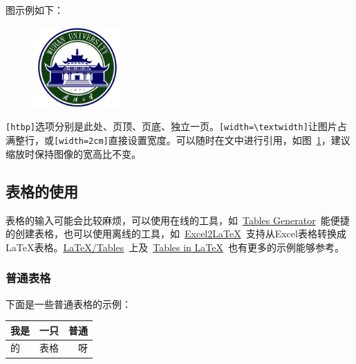 图示例如下：

\begin{figure}[!htb]
	\centering
	\includegraphics[width=0.3\textwidth]
	{figures/whulogo.png}\\
	\label{fig:whu}
\end{figure}

\verb|[htbp]|选项分别是此处、页顶、页底、独立一页。\verb|[width=\textwidth]|让图片占满整行，或\verb|[width=2cm]|直接设置宽度。可以随时在文中进行引用，如图~\ref{fig:whu}，建议缩放时保持图像的宽高比不变。

\subsection{表格的使用}

表格的输入可能会比较麻烦，可以使用在线的工具，如~\href{https://www.tablesgenerator.com/}{Tables Generator}~能便捷的创建表格，也可以使用离线的工具，如~\href{https://ctan.org/pkg/excel2latex}{Excel2LaTeX}~支持从Excel表格转换成\LaTeX{}表格。\href{https://en.wikibooks.org/wiki/LaTeX/Tables}{LaTeX/Tables}~上及~\href{https://www.tug.org/pracjourn/2007-1/mori/mori.pdf}{Tables in LaTeX}~也有更多的示例能够参考。

\subsubsection{普通表格}
下面是一些普通表格的示例：

\begin{table}[ht]
	\centering
	\renewcommand\arraystretch{1.5}  %
	\label{tab:1}
	\begin{tabular}{|l|c|r|}
		\hline
		我是 & 一只 & 普通 \\
		\hline
		的   & 表格 & 呀   \\
		\hline
	\end{tabular}
\end{table}

